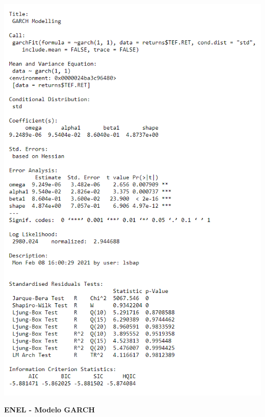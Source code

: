 \documentclass[
  12pt,
  a4paper,
  openany]{book}
\begin{document}
\begin{center}
\begin{minipage}{0.90\linewidth}
    \centering
    \includegraphics[width=2\textwidth]{image/garchtef.png}
\end{minipage}
\end{center}

\newpage

\begin{center}
 {\normalfont\Large\bfseries ENEL - Modelo GARCH}
\end{center}
\end{document}
